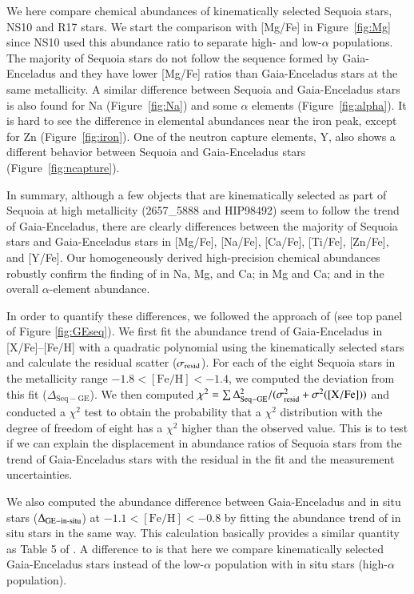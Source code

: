 \documentclass{aa}
\begin{document}
We here compare chemical abundances of kinematically selected Sequoia stars, NS10 and R17 stars.
We start the comparison with [{Mg}/{Fe}] in Figure~\ref{fig:Mg} since NS10 used this abundance ratio to separate high- and low-$\alpha$ populations.
The majority of Sequoia stars do not follow the sequence formed by Gaia-Enceladus and they have lower [{Mg}/{Fe}] ratios than Gaia-Enceladus stars at the same metallicity.
A similar difference between Sequoia and Gaia-Enceladus stars is also found for Na (Figure~\ref{fig:Na}) and some $\alpha$ elements (Figure~\ref{fig:alpha}).
It is hard to see the difference in elemental abundances near the iron peak, except for Zn (Figure~\ref{fig:iron}).
One of the neutron capture elements, Y, also shows a different behavior between Sequoia and Gaia-Enceladus stars (Figure~\ref{fig:ncapture}).


In summary, although a few objects that are kinematically selected as part of Sequoia at high metallicity (2657\_5888 and HIP98492) seem to follow the trend of Gaia-Enceladus, there are clearly differences between the majority of Sequoia stars and Gaia-Enceladus stars in [{Mg}/{Fe}], [{Na}/{Fe}], [{Ca}/{Fe}], [{Ti}/{Fe}], [{Zn}/{Fe}], and [{Y}/{Fe}].
Our homogeneously derived high-precision chemical abundances robustly confirm the finding of \citet{Matsuno2019a} in Na, Mg, and Ca; \citet{Monty2020a} in Mg and Ca; and \citet{Aguado2021a} in the overall $\alpha$-element abundance.   

In order to quantify these differences, we followed the approach of \citet{Nissen2011} (see top panel of Figure \ref{fig:GEseq}).
We first fit the abundance trend of Gaia-Enceladus in [{X}/{Fe}]--[{Fe}/{H}] with a quadratic polynomial using the kinematically selected stars and calculate the residual scatter ($\sigma_{\rm resid}$). 
For each of the eight Sequoia stars in the metallicity range $-1.8<[\mathrm{Fe/H}]<-1.4$, we computed the deviation from this fit ($\Delta_{\mathrm{Seq-GE}}$). 
We then computed $\chi^2=\sum \Delta^2_{\mathrm{Seq-GE}}  / (\sigma_{\rm resid}^2+\sigma^2([\mathrm{X/Fe}]))$ and conducted a $\chi^2$ test to obtain the probability that a $\chi^2$ distribution with the degree of freedom of eight has a $\chi^2$ higher than the observed value.
This is to test if we can explain the displacement in abundance ratios of Sequoia stars from the trend of Gaia-Enceladus stars with the residual in the fit and the measurement uncertainties. 

We also computed the abundance difference between Gaia-Enceladus and in situ stars ($\Delta_{\mathrm{GE-in{\text -}situ}}$) at $-1.1<[\mathrm{Fe/H}]<-0.8$ by fitting the abundance trend of in situ stars in the same way. 
This calculation basically provides a similar quantity as Table 5 of \citet{Nissen2011}.
A difference to \citet{Nissen2011} is that here we compare kinematically selected Gaia-Enceladus stars instead of the low-$\alpha$ population with in situ stars (high-$\alpha$ population). 
\end{document}
